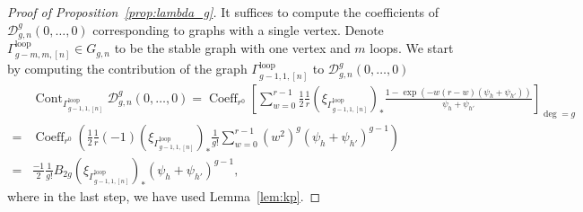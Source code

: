 \documentclass[12pt,reqno]{amsart}
\DeclareMathOperator{\Cont}{Cont}
\DeclareMathOperator{\Coeff}{Coeff}
\newcommand{\Gammaloop}{\Gamma^\mathrm{loop}}
\theoremstyle{plain}
\theoremstyle{definition}
\theoremstyle{remark}
\begin{document}
\begin{proof}[Proof of Proposition~\ref{prop:lambda_g}]
It suffices to compute the coefficients of $\mathcal{D}_{g,n}^g(0,\dots,0)$ corresponding to graphs with a single vertex.
Denote $\Gammaloop_{g-m, m, [n]} \in G_{g,n}$ to be the stable graph with one vertex and $m$ loops.
We start by computing the contribution of the graph $\Gammaloop_{g-1, 1, [n]}$ to $\mathcal{D}_{g,n}^g(0,\dots,0)$
\begin{align*}
&\Cont_{\Gammaloop_{g-1,1,[n]}}\mathcal{D}_{g,n}^g(0,\dots,0)
=\Coeff_{r^0}\left[\sum_{w=0}^{r-1}\frac{1}{2}\frac{1}{r}(\xi_{\Gammaloop_{g-1,1,[n]}})_*\frac{1-\exp(-w(r-w)(\psi_{h}+\psi_{h'}))}{\psi_{h}+\psi_{h'}}\right]_{\deg=g}
\\=&\Coeff_{r^0}\left(\frac{1}{2}\frac{1}{r}(-1)(\xi_{\Gammaloop_{g-1,1,[n]}})_* \frac 1{g!} \sum_{w=0}^{r-1}(w^2)^g(\psi_h+\psi_{h'})^{g-1}\right)
\\=&\frac{-1}{2}\frac{1}{g!}B_{2g}(\xi_{\Gammaloop_{g-1,1,[n]}})_*(\psi_h+\psi_{h'})^{g-1},
\end{align*}
where in the last step, we have used Lemma~\ref{lem:kp}.


\end{proof}
\end{document}
